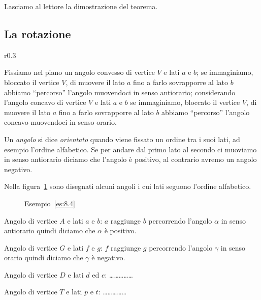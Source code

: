 Lasciamo al lettore la dimostrazione del teorema.

\subsection{La rotazione}

\setlength{\intextsep}{3pt plus 2.0pt minus 2.0pt}
\begin{wrapfigure}{r}{0.3\textwidth}
  \centering
\end{wrapfigure}
Fissiamo nel piano un angolo convesso di vertice \(V\) e lati \(a\) e 
\(b\); se immaginiamo, bloccato il vertice \(V\), di muovere il lato \(a\) 
fino a farlo sovrapporre al lato \(b\) abbiamo ``percorso'' l'angolo 
muovendoci in senso antiorario; considerando l'angolo concavo di 
vertice \(V\) e lati \(a\) e \(b\) se immaginiamo, bloccato il vertice \(V\), 
di muovere il lato \(a\) fino a farlo sovrapporre al lato \(b\) abbiamo 
``percorso'' l'angolo concavo muovendoci in senso orario.

\begin{definizione}
Un \emph{angolo} si dice \emph{orientato} quando viene fissato un 
ordine tra i suoi lati, ad esempio l'ordine alfabetico. Se per andare 
dal primo lato al secondo ci muoviamo in senso antiorario diciamo che 
l'angolo è positivo, al contrario avremo un angolo negativo.
\end{definizione}

\begin{esempio}\label{es:8.4}
Nella figura~\ref{fig:es8.4} sono disegnati alcuni angoli i cui lati 
seguono l'ordine alfabetico.


\begin{inaccessibleblock}
 \begin{figure}[!htb]
  \centering
  \caption{Esempio~\ref{es:8.4}}\label{fig:es8.4}
\end{figure}
\end{inaccessibleblock}
    
\begin{itemize*}
\item Angolo di vertice \(A\) e lati \(a\) e \(b\): \(a\) raggiunge \(b\) 
percorrendo l'angolo \(\alpha\) in senso antiorario quindi diciamo che 
\(\alpha\) è positivo.
\item Angolo di vertice \(G\) e lati \(f\) e \(g\): \(f\) raggiunge \(g\) 
percorrendo l'angolo \(\gamma\) in senso orario quindi diciamo che 
\(\gamma\) è negativo.
\item Angolo di vertice \(D\) e lati \(d\) ed \(e\): 
\ldots\ldots\ldots\ldots\ldots{}
\item Angolo di vertice \(T\) e lati \(p\) e \(t\): 
\ldots\ldots\ldots\ldots\ldots{}
\end{itemize*}
\end{esempio}
    
